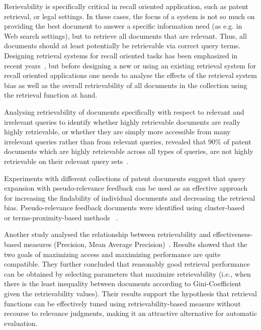 Rerievability is specifically critical in recall oriented application, such as patent retrieval, or legal settings. In these cases, the focus of a system is not so much on providing the best document to answer a specific information
need (as e.g. in Web search settings), but to retrieve all documents that are relevant. Thus, all documents should at least potentially be retrievable via correct query terms. Designing retrieval systems for recall oriented tasks has been emphasized in recent years~\citep{fujii2007introduction, kontostathis2008effect}, but before designing a new or using an existing retrieval system for recall oriented applications one needs to analyse the effects of the retrieval system bias as well as the overall retrievability of all documents in the collection using the retrieval function at hand.

Analysing retrievability of documents specifically with respect to relevant and irrelevant queries to identify whether highly retrievable documents are really highly retrievable, or whether they are simply more accessible from many irrelevant queries rather than from relevant queries, revealed that 90\% of patent documents which are highly retrievable across all types of queries, are not highly retrievable on their relevant query sets~\citep{bashir2009analyzing}.

Experiments with different collections of patent documents suggest that query expansion with pseudo-relevance feedback can be used as an effective approach for increasing the findability of individual documents and decreasing the retrieval bias. Pseudo-relevance feedback documents were identified using cluster-based ~\citep{bashir2009improving} or terms-proximity-based methods ~\citep{bashir2010improving}.

Another study analysed the relationship between retrievability and effectiveness-based measures (Precision, Mean Average Precision)~\citep{bache2010improving}. Results showed that the two goals of maximizing access and maximizing performance are quite compatible. They further concluded that reasonably good retrieval performance can be obtained by selecting parameters that maximize retrievability (i.e., when there is the least inequality between documents according to Gini-Coefficient given the retrievability values). Their results support the hypothesis that retrieval functions can be effectively tuned using retrievability-based measure without recourse to relevance judgments, making it an attractive alternative for automatic evaluation.
